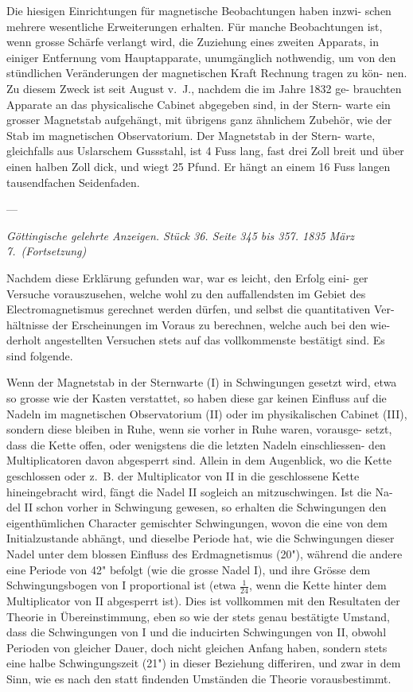 \documentclass[12pt,a4paper]{article}
\begin{document}
Die hiesigen Einrichtungen für magnetische Beobachtungen haben inzwi-
schen mehrere wesentliche Erweiterungen erhalten. Für manche Beobachtungen 
ist, wenn grosse Schärfe verlangt wird, die Zuziehung eines zweiten Apparats, 
in einiger Entfernung vom Hauptapparate, unumgänglich nothwendig, um von 
den stündlichen Veränderungen der magnetischen Kraft Rechnung tragen zu kön-
nen. Zu diesem Zweck ist seit August v.\ J., nachdem die im Jahre 1832 ge-
brauchten Apparate an das physicalische Cabinet abgegeben sind, in der Stern-
warte ein grosser Magnetstab aufgehängt, mit übrigens ganz ähnlichem Zubehör, 
wie der Stab im magnetischen Observatorium. Der Magnetstab in der Stern-
warte, gleichfalls aus Uslarschem Gussstahl, ist 4 Fuss lang, fast drei Zoll breit 
und über einen halben Zoll dick, und wiegt 25 Pfund. Er hängt an einem 16 
Fuss langen tausendfachen Seidenfaden.

---

\textit{Göttingische gelehrte Anzeigen. Stück 36. Seite 345 bis 357. 1835 März 7.\ (Fortsetzung)}

Nachdem diese Erklärung gefunden war, war es leicht, den Erfolg eini-
ger Versuche vorauszusehen, welche wohl zu den auffallendsten im Gebiet des 
Electromagnetismus gerechnet werden dürfen, und selbst die quantitativen Ver-
hältnisse der Erscheinungen im Voraus zu berechnen, welche auch bei den wie-
derholt angestellten Versuchen stets auf das vollkommenste bestätigt sind. Es 
sind folgende.

Wenn der Magnetstab in der Sternwarte (I) in Schwingungen gesetzt wird, 
etwa so grosse wie der Kasten verstattet, so haben diese gar keinen Einfluss auf 
die Nadeln im magnetischen Observatorium (II) oder im physikalischen Cabinet 
(III), sondern diese bleiben in Ruhe, wenn sie vorher in Ruhe waren, vorausge-
setzt, dass die Kette offen, oder wenigstens die die letzten Nadeln einschliessen-
den Multiplicatoren davon abgesperrt sind. Allein in dem Augenblick, wo die 
Kette geschlossen oder z.\ B. der Multiplicator von II in die geschlossene Kette 
hineingebracht wird, fängt die Nadel II sogleich an mitzuschwingen. Ist die Na-
del II schon vorher in Schwingung gewesen, so erhalten die Schwingungen den 
eigenthümlichen Character gemischter Schwingungen, wovon die eine von dem 
Initialzustande abhängt, und dieselbe Periode hat, wie die Schwingungen dieser 
Nadel unter dem blossen Einfluss des Erdmagnetismus (20"), während die andere 
eine Periode von 42" befolgt (wie die grosse Nadel I), und ihre Grösse dem 
Schwingungsbogen von I proportional ist (etwa $\tfrac{1}{24}$, wenn die Kette hinter dem 
Multiplicator von II abgesperrt ist). Dies ist vollkommen mit den Resultaten 
der Theorie in Übereinstimmung, eben so wie der stets genau bestätigte Umstand, 
dass die Schwingungen von I und die inducirten Schwingungen von II, obwohl 
Perioden von gleicher Dauer, doch nicht gleichen Anfang haben, sondern stets 
eine halbe Schwingungszeit (21") in dieser Beziehung differiren, und zwar in dem 
Sinn, wie es nach den statt findenden Umständen die Theorie vorausbestimmt.
\end{document}
